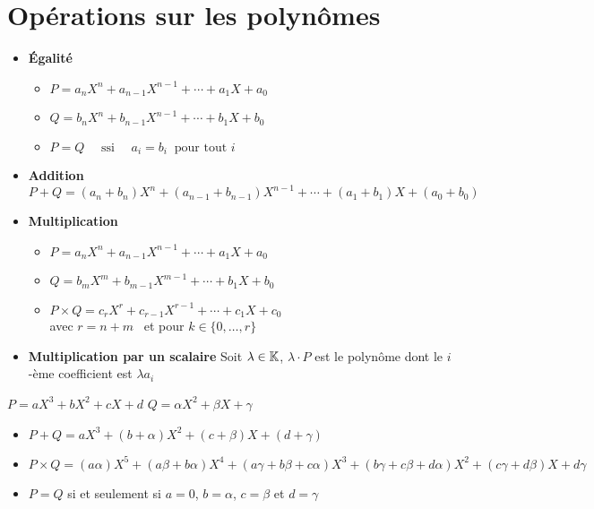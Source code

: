 \section{Opérations sur les polynômes}

\begin{frame}
\begin{itemize}
  \item \textbf{\'Egalité}
  \begin{itemize}
    \item $P=a_nX^n+a_{n-1}X^{n-1}+\cdots + a_1X+a_0$
    \item $Q=b_nX^n+b_{n-1}X^{n-1}+\cdots+b_1X+b_0$
    \item $P=Q \quad \text{  ssi } \quad a_i=b_i \ \text{ pour tout } i$
  \end{itemize}
  
  
  \pause
  
  
  \item \textbf{Addition} 
$$P+Q = (a_n+b_n)X^n+(a_{n-1}+b_{n-1})X^{n-1}+\cdots
+(a_1+b_1)X+(a_0+b_0)$$

  \pause
  
  \item \textbf{Multiplication}
  \begin{itemize}
    \item $P=a_nX^n+a_{n-1}X^{n-1}+\cdots + a_1X+a_0$
    \item $Q=b_mX^m+b_{m-1}X^{m-1}+\cdots+b_1X+b_0$
    \item $P \times Q= c_rX^r+c_{r-1}X^{r-1}+\cdots +c_1X+c_0 $ \\
    avec $r=n+m$ \ et  pour $k\in \{0,\ldots, r\}$
  \end{itemize}
  
   \pause 
   
  \item \textbf{Multiplication par un scalaire}
Soit $\lambda \in \mathbb{K}$,  $\lambda \cdot P$ est le polynôme dont le $i$-ème coefficient
est $\lambda a_i$
\end{itemize}
\end{frame}


\begin{frame}

\begin{exemple}
$P=aX^3+bX^2+cX+d$ \qquad  $Q=\alpha X^2+\beta X + \gamma$
\pause
\begin{itemize}[<+->]
  \item $P+Q =  aX^3+(b+\alpha)X^2+(c+\beta)X+(d+\gamma)$
  \item $P\times Q = (a\alpha)X^5+(a\beta+b\alpha)X^4+(a\gamma+b\beta+c\alpha)X^3
+(b\gamma+c\beta+d\alpha)X^2+(c\gamma+d\beta)X+d\gamma$
  \item $P=Q$ si et seulement si $a=0$, $b=\alpha$, $c=\beta$ et $d=\gamma$
\end{itemize}
\end{exemple}

\end{frame}




